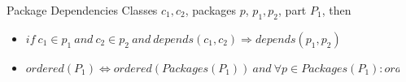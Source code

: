 \documentclass[final]{beamer}
\newlength{\sepwid}
\newlength{\onecolwid}
\begin{document}
\begin{frame}[t]
\begin{columns}[t]
    \begin{column}{\sepwid}\end{column}			%

    \begin{column}{\onecolwid}

      \begin{block}{Package Dependencies}
        Classes $c_1, c_2$, packages $p$, $p_1, p_2$, part $P_1$, then
        \begin{itemize}
          \item $if\ c_1 \in p_1\ and\ c_2 \in p_2\ and\ depends(c_1,c_2) \Rightarrow
            depends(p_1,p_2)$
          \item $ordered(P_1) \Leftrightarrow ordered(Packages(P_1))\ and\ 
            \forall p \in Packages(P_1): ordered(p)$
        \end{itemize}
      \end{block}


\end{column}
\end{columns}
\end{frame}
\end{document}
